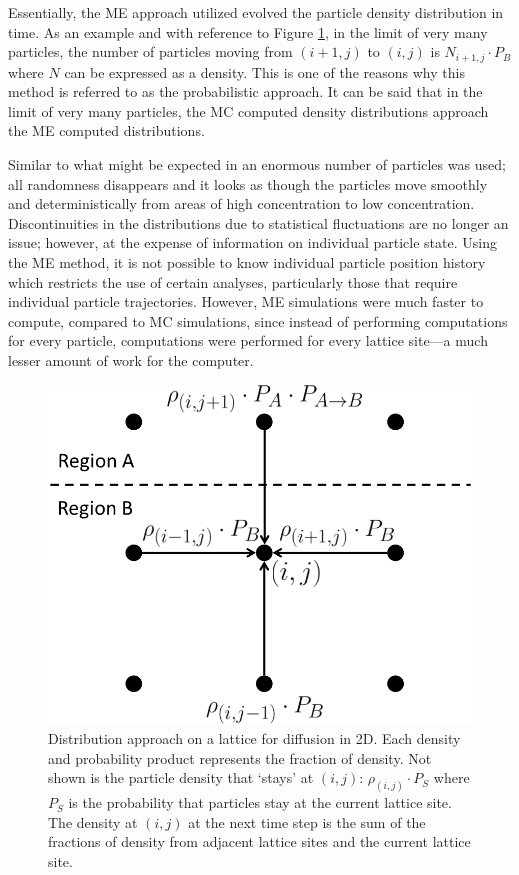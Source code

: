 	Essentially, the ME approach utilized evolved the particle density distribution in time. As an example and with reference to Figure \ref{fig:fd-distribution}, in the limit of very many particles, the number of particles moving from $ (i+1,j) $ to $ (i,j) $ is $ N_{i+1,j} \cdot P_B $ where $ N $ can be expressed as a density. This is one of the reasons why this method is referred to as the probabilistic approach. It can be said that in the limit of very many particles, the MC computed density distributions approach the ME computed distributions.

	Similar to what might be expected in an enormous number of particles was used; all randomness disappears and it looks as though the particles move smoothly and deterministically from areas of high concentration to low concentration. Discontinuities in the distributions due to statistical fluctuations are no longer an issue; however, at the expense of information on individual particle state. Using the ME method, it is not possible to know individual particle position history which restricts the use of certain analyses, particularly those that require individual particle trajectories. However, ME simulations were much faster to compute, compared to MC simulations, since instead of performing computations for every particle, computations were performed for every lattice site---a much lesser amount of work for the computer.
	
	\begin{figure}[h]
		\centering
		\includegraphics[width=0.6\linewidth]{../images/fd-distribution}
		\caption[Master equation: the density distribution approach]{Distribution approach on a lattice for diffusion in 2D. Each density and probability product represents the fraction of density. Not shown is the particle density that `stays' at $ (i,j) $: $ \rho_{(i,j)} \cdot P_S $ where $ P_S $ is the probability that particles stay at the current lattice site. The density at $ (i,j) $ at the next time step is the sum of the fractions of density from adjacent lattice sites and the current lattice site.}
		\label{fig:fd-distribution}
	\end{figure}

